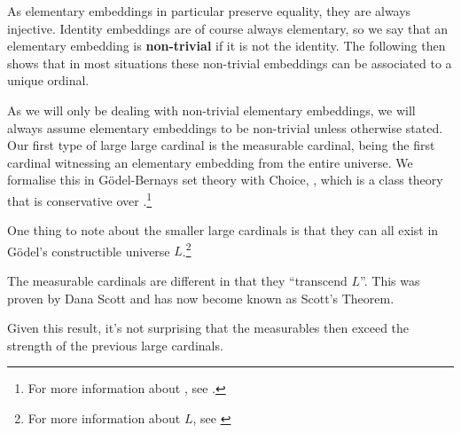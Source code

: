 \documentclass[../../main]{subfiles}
\begin{document}
As elementary embeddings in particular preserve equality, they are always injective. Identity embeddings are of course always elementary, so we say that an elementary embedding is \textbf{non-trivial} if it is not the identity. The following then shows that in most situations these non-trivial embeddings can be associated to a unique ordinal.


As we will only be dealing with non-trivial elementary embeddings, we will always assume elementary embeddings to be non-trivial unless otherwise stated. Our first type of large large cardinal is the measurable cardinal, being the first cardinal witnessing an elementary embedding from the entire universe. We formalise this in G\"odel-Bernays set theory with Choice, \gbc, which is a class theory that is conservative over \zfc.\footnote{For more information about \gbc, see \cite{gbc}.}


One thing to note about the smaller large cardinals is that they can all exist in G\"odel's constructible universe $L$.\footnote{For more information about $L$, see \cite{L}}


The measurable cardinals are different in that they ``transcend $L$''. This was proven by Dana Scott and has now become known as Scott's Theorem.


Given this result, it's not surprising that the measurables then exceed the strength of the previous large cardinals.
\end{document}
